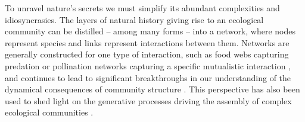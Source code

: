 \documentclass[twocolumn,preprintnumbers,amsmath,amssymb,superscriptaddress,linenumbers]{revtex4-1}
\newcommand{\rev}[1]{\textcolor{crimson}{#1}}
\begin{document}
\maketitle




To unravel nature's secrets we must simplify its abundant complexities and idiosyncrasies.
The layers of natural history giving rise to an ecological community can be distilled -- among many forms -- into a network, where nodes represent species and links represent interactions between them.
Networks are generally constructed for one type of interaction, such as food webs capturing predation \cite{Paine1966,Dunne2002,Pascual2006} or pollination networks capturing a specific mutualistic interaction \cite{Bascompte2013}, and continues to lead to significant breakthroughs in our understanding of the dynamical consequences of community structure \cite{May1972,Gross2009,Allesina2012}.
This perspective has also been used to shed light on the generative processes driving the assembly of complex ecological communities \cite{Montoya2003,Bascompte2009}.

\end{document}
